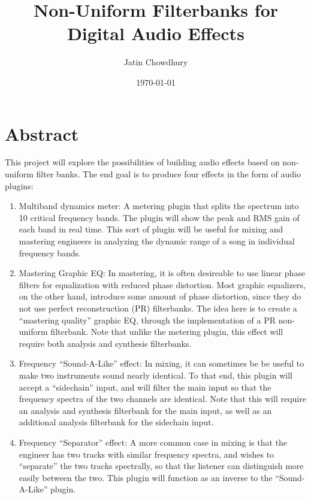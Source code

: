 \documentclass{article}
\title{Non-Uniform Filterbanks for Digital Audio Effects}
\author{Jatin Chowdhury}
\date{\today}
\begin{document}
\maketitle

\section{Abstract}
This project will explore the possibilities of building
audio effects based on non-uniform filter banks. The end goal is to
produce four effects in the form of audio plugins:
\begin{enumerate}
    \item Multiband dynamics meter: A metering plugin that splits the
    spectrum into 10 critical frequency bands. The plugin will show the
    peak and RMS gain of each band in real time. This sort of plugin will
    be useful for mixing and mastering engineers in analyzing the dynamic
    range of a song in individual frequency bands.

    \item Mastering Graphic EQ: In mastering, it is often desireable
    to use linear phase filters for equalization with reduced phase
    distortion. Most graphic equalizers, on the other hand, introduce
    some amount of phase distortion, since they do not use perfect
    reconstruction (PR) filterbanks. The idea here is to create a
    ``mastering quality'' graphic EQ, through the implementation of a
    PR non-uniform filterbank. Note that unlike the metering plugin,
    this effect will require both analysis and synthesis filterbanks.

    \item Frequency ``Sound-A-Like'' effect: In mixing, it can sometimes be
    be useful to make two instruments sound nearly identical. To that end,
    this plugin will accept a ``sidechain'' input, and will filter the main
    input so that the frequency spectra of the two channels are identical.
    Note that this will require an analysis and synthesis filterbank for the
    main input, as well as an additional analysis filterbank for the sidechain
    input.

    \item Frequency ``Separator'' effect: A more common case in mixing is
    that the engineer has two tracks with similar frequency spectra, and
    wishes to ``separate'' the two tracks spectrally, so that the listener
    can distinguish more easily between the two. This plugin will function
    as an inverse to the ``Sound-A-Like'' plugin.
\end{enumerate}
\end{document}
